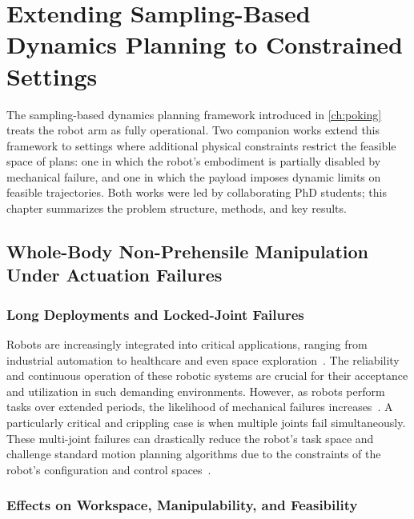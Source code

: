 
\chapter{Extending Sampling-Based Dynamics Planning to Constrained Settings}
\label{ch:constrained}

The sampling-based dynamics planning framework introduced in \cref{ch:poking} treats the robot arm as fully operational.
Two companion works extend this framework to settings where additional physical constraints restrict the feasible space of plans: one in which the robot's embodiment is partially disabled by mechanical failure, and one in which the payload imposes dynamic limits on feasible trajectories.
Both works were led by collaborating PhD students; this chapter summarizes the problem structure, methods, and key results.

\section{Whole-Body Non-Prehensile Manipulation Under Actuation Failures}
\label{sec:constrained:failures}

\subsection{Long Deployments and Locked-Joint Failures}
\label{sec:constrained:deployments}

Robots are increasingly integrated into critical applications, ranging from industrial automation to healthcare and even space exploration~\cite{CensusSurveyRobotic2022, Kyrarini2021, papadopoulos2021robotic}.
The reliability and continuous operation of these robotic systems are crucial for their acceptance and utilization in such demanding environments.
However, as robots perform tasks over extended periods, the likelihood of mechanical failures increases~\cite{austin2020robotic, She2016, muirhead2012coalescing}.
A particularly critical and crippling case is when multiple joints fail simultaneously.
These multi-joint failures can drastically reduce the robot's task space and challenge standard motion planning algorithms due to the constraints of the robot's configuration and control spaces~\cite{kingston2018sampling}.

\subsection{Effects on Workspace, Manipulability, and Feasibility}
\label{sec:constrained:effects}

